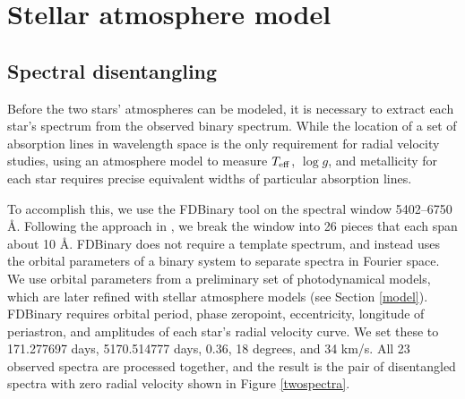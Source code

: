 \section{Stellar atmosphere model}\label{atm}

\subsection{Spectral disentangling}\label{disentangle}
Before the two stars' atmospheres can be modeled, it is necessary to extract each star's spectrum from the observed binary spectrum. While the location of a set of absorption lines in wavelength space is the only requirement for radial velocity studies, using an atmosphere model to measure $T_{\rm{eff}}$, $\log g$, and metallicity for each star requires precise equivalent widths of particular absorption lines.

To accomplish this, we use the FDBinary tool \citep{ili04} on the spectral window 5402--6750 \AA. Following the approach in \citet{bec14}, we break the window into 26 pieces that each span about 10 \AA. FDBinary does not require a template spectrum, and instead uses the orbital parameters of a binary system to separate spectra in Fourier space. We use orbital parameters from a preliminary set of photodynamical models, which are later refined with stellar atmosphere models (see Section \ref{model}). FDBinary requires orbital period, phase zeropoint, eccentricity, longitude of periastron, and amplitudes of each star's radial velocity curve. We set these to 171.277697 days, 5170.514777 days, 0.36, 18 degrees, and 34 km/s. All 23 observed spectra are processed together, and the result is the pair of disentangled spectra with zero radial velocity shown in Figure \ref{twospectra}.
